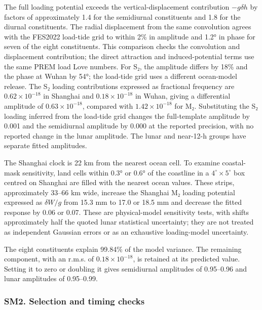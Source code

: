 \documentclass[
  11pt,
  a4paper,
]{article}
\begin{document}
The full loading potential exceeds the vertical-displacement
contribution \(-g\delta h\) by factors of approximately 1.4 for the
semidiurnal constituents and 1.8 for the diurnal constituents. The
radial displacement from the same convolution agrees with the FES2022
load-tide grid to within 2\% in amplitude and 1.2° in phase for seven of
the eight constituents. This comparison checks the convolution and
displacement contribution; the direct attraction and induced-potential
terms use the same PREM load Love numbers. For S₂, the amplitude differs
by 18\% and the phase at Wuhan by 54°; the load-tide grid uses a
different ocean-model release. The S₂ loading contributions expressed as
fractional frequency are \(0.62\times10^{-18}\) in Shanghai and
\(0.18\times10^{-18}\) in Wuhan, giving a differential amplitude of
\(0.63\times10^{-18}\), compared with \(1.42\times10^{-18}\) for M₂.
Substituting the S₂ loading inferred from the load-tide grid changes the
full-template amplitude by 0.001 and the semidiurnal amplitude by 0.000
at the reported precision, with no reported change in the lunar
amplitude. The lunar and near-12-h groups have separate fitted
amplitudes.

The Shanghai clock is 22 km from the nearest ocean cell. To examine
coastal-mask sensitivity, land cells within 0.3° or 0.6° of the
coastline in a \(4^\circ\times5^\circ\) box centred on Shanghai are
filled with the nearest ocean values. These strips, approximately 33--66
km wide, increase the Shanghai M₂ loading potential expressed as
\(\delta W/g\) from 15.3 mm to 17.0 or 18.5 mm and decrease the fitted
response by 0.06 or 0.07. These are physical-model sensitivity tests,
with shifts approximately half the quoted lunar statistical uncertainty;
they are not treated as independent Gaussian errors or as an exhaustive
loading-model uncertainty.

The eight constituents explain 99.84\% of the model variance. The
remaining component, with an r.m.s. of \(0.18\times10^{-18}\), is
retained at its predicted value. Setting it to zero or doubling it gives
semidiurnal amplitudes of 0.95--0.96 and lunar amplitudes of 0.95--0.99.

\hypertarget{sm2.-selection-and-timing-checks}{%
\subsubsection{SM2. Selection and timing
checks}\label{sm2.-selection-and-timing-checks}}
\end{document}
